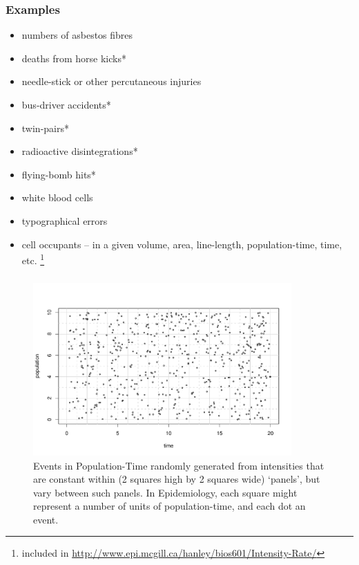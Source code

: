 \documentclass{beamer}\usepackage[]{graphicx}\usepackage[]{color}
\begin{document}
\begin{frame}
\frametitle{Examples}

\begin{itemize}
	\setlength\itemsep{0.5em}
	\item numbers of asbestos fibres
	\item deaths from horse kicks*
	\item needle-stick or other percutaneous injuries
	\item bus-driver accidents*
	\item twin-pairs*
	\item radioactive disintegrations*
	\item flying-bomb hits*
	\item white blood cells
	\item typographical errors
	\item cell occupants -- in a given volume, area, line-length, population-time, time, etc. 
	\footnote{\footnotesize * included in \url{http://www.epi.mcgill.ca/hanley/bios601/Intensity-Rate/}}
\end{itemize}
\end{frame}



\begin{frame}
\frametitle{}
\begin{figure}[h]
	\begin{center}
		\includegraphics[width=3.9in,height=2.6in]{DotsinPopulationTime64.pdf}
		\caption{Events in Population-Time randomly generated from intensities that are constant within (2 squares high by 2 squares wide) `panels', but vary between such panels. In Epidemiology, each square might represent a number of units of population-time, and each dot an event.}
	\end{center}
\end{figure}
\end{frame}
\end{document}
